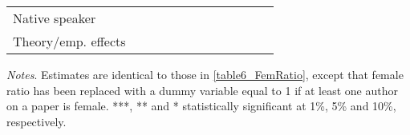 \begin{sidewaystable}
\begin{threeparttable}
\begin{tabular}{p{3cm}S@{}S@{}S@{}S@{}S@{}S@{}S@{}S@{}S@{}S@{}S@{}}
            Native speaker                &               &           {}   &               &           {}   &               &           {}   &               &           {}   &               &               &               \\
            Theory/emp. effects           &               &           {}   &               &           {}   &               &           {}   &               &           {}   &               &               &               \\
            \bottomrule
        \end{tabular}
        \begin{tablenotes}
            \tiny
            \item \textit{Notes}. Estimates are identical to those in \autoref{table6_FemRatio}, except that female ratio has been replaced with a dummy variable equal to 1 if at least one author on a paper is female. ***, ** and * statistically significant at 1\%, 5\% and 10\%, respectively.
        \end{tablenotes}
    \end{threeparttable}

\end{sidewaystable}
